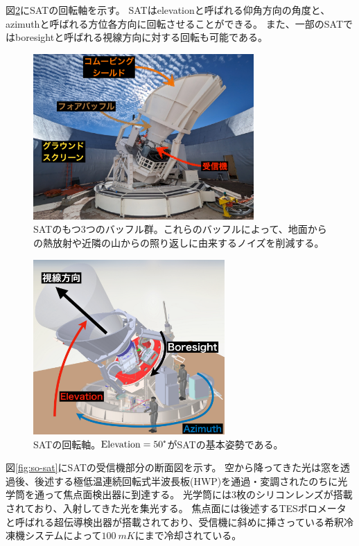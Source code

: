 \documentclass[../../main.tex]{subfiles}
\begin{document}
図\ref{fig:so-sat_angle}にSATの回転軸を示す。
SATはelevationと呼ばれる仰角方向の角度と、azimuthと呼ばれる方位各方向に回転させることができる。
また、一部のSATではboresightと呼ばれる視線方向に対する回転も可能である。
\begin{figure}[H]
    \centering
    \includegraphics[width=0.75\textwidth]{simons_observatory/sat_baffle.pdf}
    \caption{SATのもつ3つのバッフル群。これらのバッフルによって、地面からの熱放射や近隣の山からの照り返しに由来するノイズを削減する。}
    \label{fig:so-sat_baffle}
\end{figure}
\begin{figure}[H]
    \centering
    \includegraphics[width=0.65\textwidth]{simons_observatory/sat_angle.pdf}
    \caption{SATの回転軸。$\mathrm{Elevation}=50\tcdegree$がSATの基本姿勢である。}
    \label{fig:so-sat_angle}
\end{figure}

図\ref{fig:so-sat}にSATの受信機部分の断面図を示す。
空から降ってきた光は窓を透過後、後述する極低温連続回転式半波長板(HWP)を通過・変調されたのちに光学筒を通って焦点面検出器に到達する。
光学筒には3枚のシリコンレンズが搭載されており、入射してきた光を集光する。
焦点面には後述するTESボロメータと呼ばれる超伝導検出器が搭載されており、受信機に斜めに挿さっている希釈冷凍機システムによって$\SI{100}{mK}$にまで冷却されている\cite{galitzki2024simonsobservatorydesignintegration}。
\end{document}
